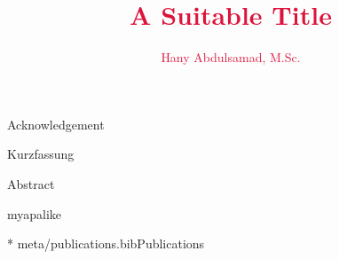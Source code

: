\documentclass{iasthesis}
\begin{document}

\title{\textcolor{crimson} {A Suitable Title}}
\author{\textcolor{crimson} {Hany Abdulsamad, M.Sc.}}

\maketitle



\begin{tudprints}
	
\end{tudprints}



\begin{dedication}
	
\end{dedication}

\newpage\null\thispagestyle{empty}\newpage



\begin{meta}{Acknowledgement}
	
\end{meta}

\begin{meta}{Kurzfassung}
	\begin{otherlanguage}{ngerman}
		
	\end{otherlanguage}
\end{meta}

\begin{meta}{Abstract}
	
\end{meta}



\setlength{\bibitemsep}{.75\baselineskip plus .05\baselineskip minus .05\baselineskip}

{myapalike}

\nocite{pubs}{*}
{meta/publications.bib}{Publications}


\dominitoc[n]
\end{document}
